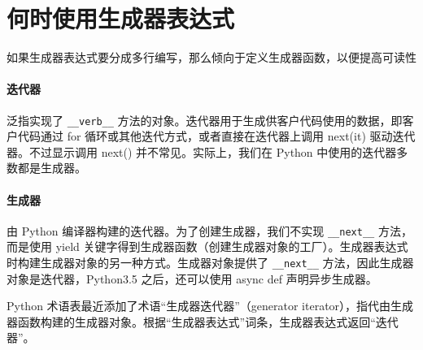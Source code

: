 \section{何时使用生成器表达式}
如果生成器表达式要分成多行编写，那么倾向于定义生成器函数，以便提高可读性
\begin{tcolorbox}[title=对比迭代器和生成器]
    \paragraph{迭代器} 泛指实现了 \verb|__verb__| 方法的对象。迭代器用于生成供客户代码使用的数据，即客户代码通过 for 循环或其他迭代方式，或者直接在迭代器上调用 next(it) 驱动迭代器。不过显示调用 next() 并不常见。实际上，我们在 Python 中使用的迭代器多数都是生成器。
    \paragraph{生成器} 由 Python 编译器构建的迭代器。为了创建生成器，我们不实现 \verb|__next__| 方法，而是使用 yield 关键字得到生成器函数（创建生成器对象的工厂）。生成器表达式时构建生成器对象的另一种方式。生成器对象提供了 \verb|__next__| 方法，因此生成器对象是迭代器，Python3.5 之后，还可以使用 async def 声明异步生成器。
\end{tcolorbox}

Python 术语表最近添加了术语“生成器迭代器”（generator iterator），指代由生成器函数构建的生成器对象。根据“生成器表达式”词条，生成器表达式返回“迭代器”。
